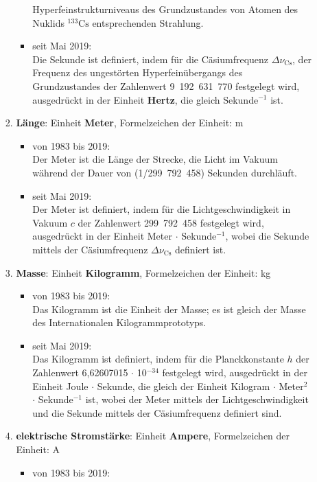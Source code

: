 \begin{raggedright}
\begin{enumerate}
\begin{itemize}
\begin{enumerate}[1.)]
\begin{itemize}
			Hyperfeinstrukturniveaus des Grundzustandes von
			Atomen des Nuklids $^{133}\mathrm{Cs}$ entsprechenden Strahlung.
			\item seit Mai 2019:\\
      Die Sekunde ist definiert, indem für die Cäsiumfrequenz
      $\Delta \nu_\mathrm{Cs}$, der Frequenz des ungestörten Hyperfeinübergangs
      des Grundzustandes der Zahlenwert 9~192~631~770 festgelegt wird, ausgedrückt in der
      Einheit \textbf{Hertz}, die gleich Sekunde$^{-1}$ ist.
			\end{itemize}
		\item \textbf{Länge}: Einheit \textbf{Meter}, Formelzeichen der Einheit: m
			\begin{itemize}
			\item von 1983 bis 2019:\\
			Der Meter ist die Länge der Strecke, die Licht im Vakuum
			während der Dauer von (1/299~792~458) Sekunden durchläuft.
			\item seit Mai 2019:\\
      Der Meter ist definiert, indem für die Lichtgeschwindigkeit in
      Vakuum $c$ der Zahlenwert 299~792~458 festgelegt wird, ausgedrückt in der
      Einheit Meter $\cdot$ Sekunde$^{-1}$,
      wobei die Sekunde mittels der Cäsiumfrequenz
      $\Delta \nu_\mathrm{Cs}$ definiert ist.
			\end{itemize}
		\item \textbf{Masse}: Einheit \textbf{Kilogramm}, Formelzeichen der Einheit: kg
			\begin{itemize}
			\item von 1983 bis 2019:\\
			Das Kilogramm ist die Einheit der Masse;
			es ist gleich der Masse des Internationalen Kilogrammprototyps.
			\item seit Mai 2019:\\
       Das Kilogramm ist definiert, indem für die Planckkonstante $h$ der
       Zahlenwert 6,62607015 $\cdot$ 10$^{-34}$ festgelegt wird,
       ausgedrückt in der Einheit Joule $\cdot$ Sekunde, die gleich der Einheit
       Kilogram $\cdot$ Meter$^2$ $\cdot$ Sekunde$^{-1}$ ist, wobei der Meter mittels
       der Lichtgeschwindigkeit und die Sekunde mittels der Cäsiumfrequenz
       definiert sind.
			\end{itemize}
		\item \textbf{elektrische Stromstärke}: Einheit \textbf{Ampere}, Formelzeichen der Einheit: A
			\begin{itemize}
			\item von 1983 bis 2019:\\

\end{itemize}
\end{enumerate}
\end{itemize}
\end{enumerate}
\end{raggedright}
